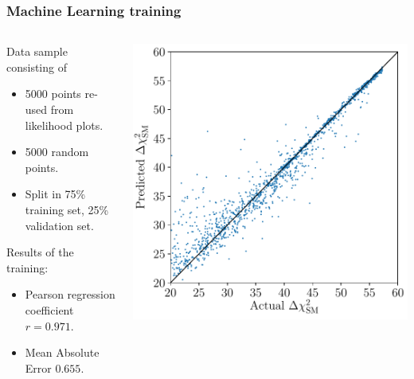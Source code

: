 \documentclass[mathserif, 10pt]{beamer}
\begin{document}
\begin{frame}
    \frametitle{Machine Learning training}

    \begin{columns}
        \begin{column}{0.5\textwidth}
            Data sample consisting of
            \begin{itemize}
                \item 5000 points re-used from likelihood plots.
                \item 5000 random points.
                \item Split in 75\% training set, 25\% validation set.
            \end{itemize}
            Results of the training:
            \begin{itemize}
                \item Pearson regression coefficient $r=0.971$.
                \item Mean Absolute Error $0.655$.
            \end{itemize}
        \end{column}
        \begin{column}{0.5\textwidth}
            \includegraphics[width=\columnwidth]{figures/regression_xgb.pdf}
        \end{column}
    \end{columns}

\end{frame}
\end{document}
